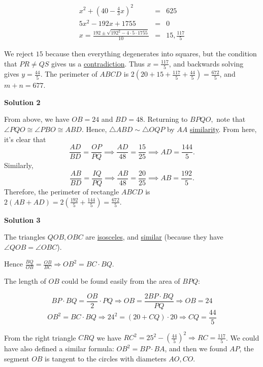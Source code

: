 \begin{enumerate}
 
 \begin{eqnarray*}x^2 + \left(40-\frac 43x\right)^2 &=& 625\\ 5x^2 - 192x + 1755 &=& 0\\ x = \frac{192 \pm \sqrt{192^2 - 4 \cdot 5 \cdot 1755}}{10} &=& 15, \frac{117}{5}\end{eqnarray*}

 We reject $15$ because then everything degenerates into squares, but the condition that $PR \neq QS$ gives us a \href{https://artofproblemsolving.com/wiki/index.php?title=Contradiction}{contradiction}. Thus $x = \frac{117}{5}$, and backwards solving gives $y = \frac{44}5$. The perimeter of $ABCD$ is $2\left(20 + 15 + \frac{117}{5} + \frac{44}5\right) = \frac{672}{5}$, and $m + n = \boxed{677}$.

 



\textbf{Solution 2}

From above, we have $OB = 24$ and $BD = 48$. Returning to $BPQO,$ note that $\angle PQO\cong \angle PBO \cong ABD.$ Hence, $\triangle ABD \sim \triangle OQP$ by $AA$ \href{https://artofproblemsolving.com/wiki/index.php?title=Similar\_triangle&action=edit&redlink=1}{similarity}. From here, it's clear that
 \[\frac {AD}{BD} = \frac {OP}{PQ}\implies \frac {AD}{48} = \frac {15}{25}\implies AD = \frac {144}{5}.\]Similarly,
 \[\frac {AB}{BD} = \frac {IQ}{PQ}\implies \frac {AB}{48} = \frac {20}{25}\implies AB = \frac {192}{5}.\]Therefore, the perimeter of rectangle $ABCD$ is $2(AB + AD) = 2\left(\frac {192}{5} + \frac {144}{5}\right) = \frac {672}{5}.$




\textbf{Solution 3}

The triangles $QOB,OBC$ are \href{https://artofproblemsolving.com/wiki/index.php?title=Isosceles\_triangle}{isosceles}, and \href{https://artofproblemsolving.com/wiki/index.php?title=Similar\_triangles}{similar} (because they have $\angle QOB = \angle OBC$).

 Hence $\frac {BQ}{OB} = \frac {OB}{BC} \Rightarrow OB^2 = BC \cdot BQ$.

 The length of $OB$ could be found easily from the area of $BPQ$:

 
 \[BP \cdot BQ = \frac {OB}{2} \cdot PQ \Rightarrow OB = \frac {2BP\cdot BQ}{PQ} \Rightarrow OB = 24\]
 \[OB^2 = BC \cdot BQ \Rightarrow 24^2 = (20 + CQ) \cdot 20 \Rightarrow CQ = \frac {44}{5}\]

 From the right triangle $CRQ$ we have $RC^2 = 25^2 - \left(\frac {44}{5}\right)^2\Rightarrow RC = \frac {117}{5}$. We could have also defined a similar formula: $OB^2 = BP \cdot BA$, and then we found $AP$, the segment $OB$ is tangent to the circles with diameters $AO,CO$.


\end{enumerate}
